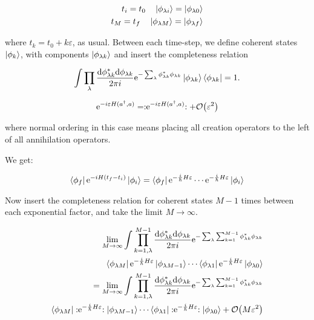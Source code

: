 \begin{align*}
    t_{i} = t_{0} \quad \ket{\phi_{\lambda i}} = \ket{\phi_{\lambda 0}} \\ 
    t_{M} = t_{f} \quad \ket{\phi_{\lambda M}} = \ket{\phi_{\lambda f}}
\end{align*}

where $t_{k} = t_{0} + k\varepsilon$, as usual. Between each time-step, we define coherent states $\ket{\phi_{k}}$, with components $\ket{\phi_{\lambda k}}$ and insert the completeness relation

\begin{equation*}
    \int \prod_{\lambda} \frac{\dd \phi_{\lambda k}^{*} \dd \phi_{\lambda k}}{2\pi i} \mathrm{e}^{-\sum_{\lambda} \phi_{\lambda k}^{*} \phi_{\lambda k}} \ket{\phi_{\lambda k}} \bra{\phi_{\lambda k}} = 1.
\end{equation*}

\begin{equation*}
    \e^{-i\varepsilon H(a^{\dagger}, a)} = \normord{\e^{-i\varepsilon H(a^{\dagger}, a)}} + \order{\varepsilon^{2}}
\end{equation*}

where normal ordering in this case means placing all creation operators to the left of all annihilation operators. 

We get: 

\begin{equation*}
    \bra{\phi_{f}} \mathrm{e}^{-iH(t_{f} - t_{i})} \ket{\phi_{i}} = \bra{\phi_{f}} \mathrm{e}^{-\frac{i}{\hbar} H \varepsilon} \cdots  \mathrm{e}^{-\frac{i}{\hbar} H \varepsilon} \ket{\phi_{i}}
\end{equation*}

Now insert the completeness relation for coherent states $M-1$ times between each exponential factor, and take the limit $M \to \infty$. 

\begin{align*}
    \lim_{M \to \infty} \int \prod_{k = 1, \lambda}^{M-1} \frac{\dd \phi_{\lambda k}^{*} \dd \phi_{\lambda k}}{2\pi i} \e^{-\sum_{\lambda} \sum_{k = 1}^{M-1}\phi_{\lambda k}^{*} \phi_{\lambda k}}  \\ \bra{\phi_{\lambda M}} \e^{-\frac{i}{\hbar} H \varepsilon}\ket{\phi_{\lambda M-1}} \cdots \bra{\phi_{\lambda 1}} \e^{-\frac{i}{\hbar} H \varepsilon}\ket{\phi_{\lambda 0}} \\ 
    = \lim_{M \to \infty} \int \prod_{k = 1, \lambda}^{M-1} \frac{\dd \phi_{\lambda k}^{*} \dd \phi_{\lambda k}}{2\pi i} \e^{-\sum_{\lambda} \sum_{k = 1}^{M-1}\phi_{\lambda k}^{*} \phi_{\lambda k}}\\ \bra{\phi_{\lambda M}} \normord{\e^{-\frac{i}{\hbar} H \varepsilon}}\ket{\phi_{\lambda M-1}} \cdots \bra{\phi_{\lambda 1}} \normord{\e^{-\frac{i}{\hbar} H \varepsilon}}\ket{\phi_{\lambda 0}} + \order{M\varepsilon^{2}}
\end{align*}

